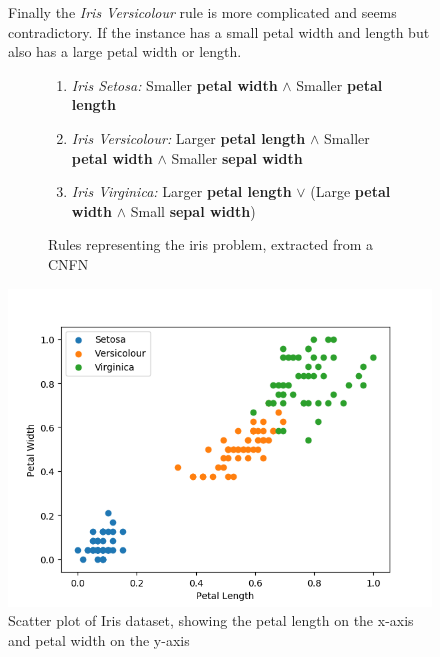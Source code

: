 \begin{figure}[H]
	\centering

	\begin{minipage}[p]{0.51\textwidth}
	 Finally the \textit{Iris Versicolour} rule is more complicated and seems contradictory. If the instance has a small petal width and length but also has a large petal width or length.
	 \begin{figure}[H]
	 	\begin{enumerate}
	 		\item \textit{Iris Setosa: } Smaller \textbf{petal width} $\land$ Smaller \textbf{petal length}
	 		\item \textit{Iris Versicolour: } Larger \textbf{petal length} $\land$ Smaller \textbf{petal width} $\land$ Smaller \textbf{sepal width}
	 		\item \textit{Iris Virginica: } Larger \textbf{petal length} $\lor$ (Large \textbf{petal width} $\land$ Small \textbf{sepal width})
	 	\end{enumerate}
 		\caption{Rules representing the iris problem, extracted from a CNFN}
 		\label{fig:iris-rules}
	 \end{figure}
	\end{minipage}
	\hspace{4px}
	\begin{minipage}[p]{0.45\textwidth}
		\includegraphics[width=\textwidth]{IrisData(petal(length-vs-width)).png}
		\caption{Scatter plot of Iris dataset, showing the petal length on the x-axis and petal width on the y-axis}
		\label{fig:iris-data-petal-length-vs-width}
	\end{minipage}
	\hfill
\end{figure}

